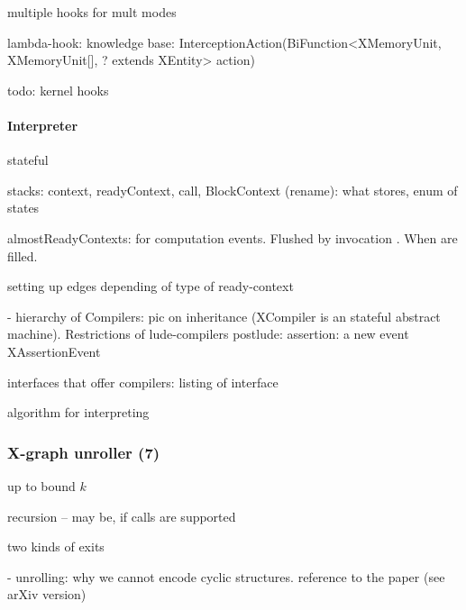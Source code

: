 multiple hooks for mult modes

lambda-hook: knowledge base: InterceptionAction(BiFunction<XMemoryUnit, XMemoryUnit[], ? extends XEntity> action)

todo: kernel hooks



\paragraph{Interpreter}
\label{ch:impl:proc:x-compiler:compilation}

stateful

stacks: context, readyContext, call, 
  BlockContext (rename): what stores, enum of states
  
almostReadyContexts: for computation events. Flushed by invocation . When are filled.

setting up edges depending of type of ready-context

- hierarchy of Compilers: pic on inheritance (XCompiler is an stateful abstract machine). Restrictions of lude-compilers
  postlude: assertion: a new event XAssertionEvent

interfaces that offer compilers: listing of interface

algorithm for interpreting



\subsubsection{X-graph unroller (7)}
\label{ch:impl:proc:x-unroll}

up to bound $k$ 

recursion -- may be, if calls are supported

two kinds of exits

- unrolling: why we cannot encode cyclic structures. reference to the paper (see arXiv version)

